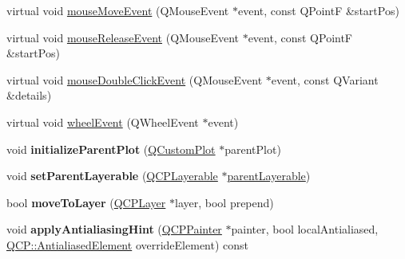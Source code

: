 \begin{DoxyCompactItemize}
virtual void \mbox{\hyperlink{class_q_c_p_layerable_a9eee1ba47fd69be111059ca3881933e4}{mouse\+Move\+Event}} (Q\+Mouse\+Event $\ast$event, const Q\+PointF \&start\+Pos)
\item 
virtual void \mbox{\hyperlink{class_q_c_p_layerable_aa0d79b005686f668622bbe66ac03ba2c}{mouse\+Release\+Event}} (Q\+Mouse\+Event $\ast$event, const Q\+PointF \&start\+Pos)
\item 
virtual void \mbox{\hyperlink{class_q_c_p_layerable_a4171e2e823aca242dd0279f00ed2de81}{mouse\+Double\+Click\+Event}} (Q\+Mouse\+Event $\ast$event, const Q\+Variant \&details)
\item 
virtual void \mbox{\hyperlink{class_q_c_p_layerable_a47dfd7b8fd99c08ca54e09c362b6f022}{wheel\+Event}} (Q\+Wheel\+Event $\ast$event)
\item 
\mbox{\label{class_q_c_p_layerable_a8cbe5a0c9a5674249982f5ca5f8e02bc}} 
void {\bfseries initialize\+Parent\+Plot} (\mbox{\hyperlink{class_q_custom_plot}{Q\+Custom\+Plot}} $\ast$parent\+Plot)
\item 
\mbox{\label{class_q_c_p_layerable_aa23c893671f1f6744ac235cf2204cf3a}} 
void {\bfseries set\+Parent\+Layerable} (\mbox{\hyperlink{class_q_c_p_layerable}{Q\+C\+P\+Layerable}} $\ast$\mbox{\hyperlink{class_q_c_p_layerable_aa78b7e644d2c519e1a9a6f2ac5fcd858}{parent\+Layerable}})
\item 
\mbox{\label{class_q_c_p_layerable_af94484cfb7cbbddb7de522e9be71d9a4}} 
bool {\bfseries move\+To\+Layer} (\mbox{\hyperlink{class_q_c_p_layer}{Q\+C\+P\+Layer}} $\ast$layer, bool prepend)
\item 
\mbox{\label{class_q_c_p_layerable_acb663e375d2d36dc5c55021ee5a2119b}} 
void {\bfseries apply\+Antialiasing\+Hint} (\mbox{\hyperlink{class_q_c_p_painter}{Q\+C\+P\+Painter}} $\ast$painter, bool local\+Antialiased, \mbox{\hyperlink{namespace_q_c_p_ae55dbe315d41fe80f29ba88100843a0c}{Q\+C\+P\+::\+Antialiased\+Element}} override\+Element) const
\end{DoxyCompactItemize}
